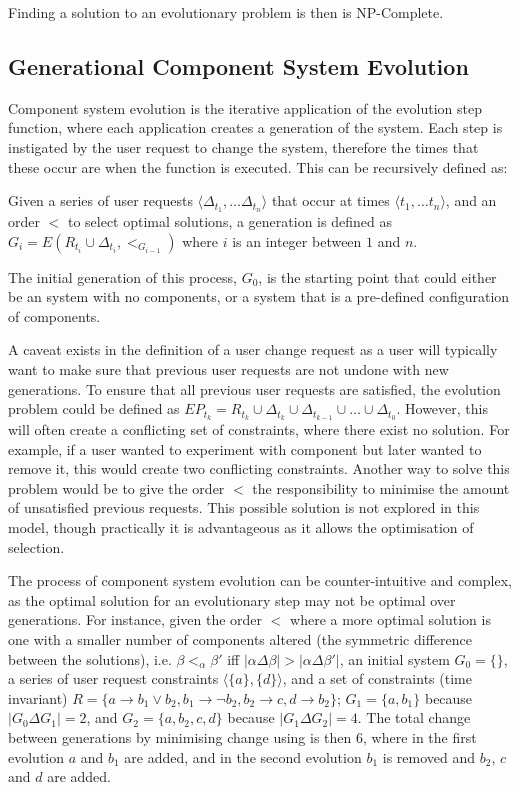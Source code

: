Finding a solution to an evolutionary problem is then is NP-Complete.

\subsection{Generational Component System Evolution}
\label{formal.evo}
Component system evolution is the iterative application of the evolution step function, where each application creates a generation of the system.
Each step is instigated by the user request to change the system, therefore the times that these occur are when the function is executed.
This can be recursively defined as:
\begin{defs}
Given a series of user requests $\langle \Delta_{t_1},\ldots \Delta_{t_n} \rangle$ that occur at times $\langle t_1,\ldots t_n \rangle$, and an order $<$ to select optimal solutions, 
a generation is defined as $G_i = E(R_{t_i} \cup \Delta_{t_i},<_{G_{i-1}})$ where $i$ is an integer between $1$ and $n$.
\end{defs}
The initial generation of this process, $G_0$, is the starting point that could either be an system with no components, or a system that is a pre-defined configuration of components.

A caveat exists in the definition of a user change request as a user will typically want to make sure that previous user requests are not undone with new generations.
To ensure that all previous user requests are satisfied, the evolution problem could be defined as 
$EP_{t_k} = R_{t_k} \cup \Delta_{t_k} \cup \Delta_{t_{k-1}} \cup \ldots \cup \Delta_{t_{0}}$.
However, this will often create a conflicting set of constraints, where there exist no solution.
For example, if a user wanted to experiment with component but later wanted to remove it, this would create two conflicting constraints.
Another way to solve this problem would be to give the order $<$ the responsibility to minimise the amount of unsatisfied previous requests.
This possible solution is not explored in this model, though practically it is advantageous as it allows the optimisation of selection.

The process of component system evolution can be counter-intuitive and complex, as the optimal solution for an evolutionary step may not be optimal over generations.
For instance, given the order $<$ where a more optimal solution is one with a smaller number of components altered (the symmetric difference between the solutions), 
i.e. $\beta <_{\alpha} \beta'$ iff $|\alpha \Delta \beta| > |\alpha \Delta \beta'|$,
an initial system $G_0 = \{\}$, a series of user request constraints $\langle \{a\}, \{d\}\rangle$, 
and a set of constraints (time invariant) $R = \{a \rightarrow b_1 \vee b_2, b_1 \rightarrow \neg b_2, b_2 \rightarrow c, d \rightarrow b_2\}$;
$G_1 = \{a,b_1\}$ because $|G_0 \Delta G_1| = 2$, and $G_2 = \{a,b_2,c,d\}$ because $|G_1 \Delta G_2| = 4$.
The total change between generations by minimising change using is then $6$, where in the first evolution $a$ and $b_1$ are added, 
and in the second evolution $b_1$ is removed and $b_2$, $c$ and $d$ are added.

